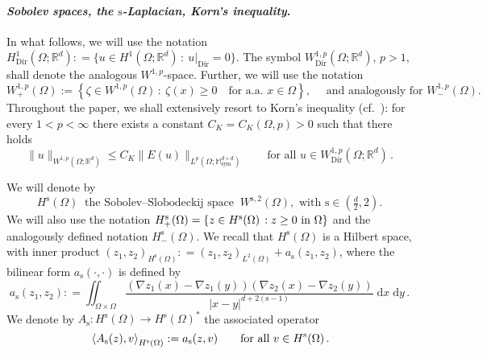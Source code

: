 \documentclass[a4paper,10pt,reqno]{amsart}
\numberwithin{equation}{section}
\newcommand{\bbM}{\mathbb{M}}
\newcommand{\R}{\mathbb{R}}
\numberwithin{equation}{section}
\def\dd{\;\!\mathrm{d}} %
\newcommand{\pairing}[4]{ \sideset{_{ #1 }}{_{ #2 }}  {\mathop{\langle #3 , #4
\rangle}}}
\newcommand{\foraa}{\text{for a.a. }}
\newcommand{\sig}[1]{E(#1)}
\newcommand{\Dir}{\mathrm{Dir}}
\newcommand{\mt}{\bbM}
\newcommand{\sym}{\mathrm{sym}}
\newcommand{\spz}{H^{\mathrm{s}}(\Omega)}
\newcommand{\As}{A_{\mathrm{s}}}
\newcommand{\ass}{a_{\mathrm{s}}}
\newcommand{\EEE}{\color{black}}
\newcommand{\MMM}{\color{black}}%
\begin{document}
    \paragraph{{\em Sobolev spaces, the $\mathrm{s}$-Laplacian, Korn's inequality}.}
  In what follows,  we will use the notation 
  $
  H_\Dir^1(\Omega;\R^d): = \{ u \in H^1(\Omega;\R^d)\, : \ u{|}_{\Dir} = 0 \}.
  $
  The symbol $W_\Dir^{1,p}(\Omega;\R^d)$, $p>1,$  shall denote the analogous $W^{1,p}$-space.
    Further,  we will use the notation \begin{equation}
\label{label-added}
 W_+^{1,p}(\Omega):= \left\{\zeta \in
W^{1,p}(\Omega)\, : \ \zeta(x) \geq 0  \quad \foraa x \in
\Omega \right\}, \quad \text{ and analogously for }
W_-^{1,p}(\Omega).
\end{equation} 
Throughout the paper,
 we shall extensively resort to Korn's inequality (cf.\ \cite{GeySu86}): for every $1<p<\infty$ there exists a constant $C_K = C_K(\Omega, p)>0$ such that there holds
\begin{equation}
\label{Korn}
\| u \|_{W^{1,p}(\Omega;\R^d)} \leq C_K \| \sig u \|_{L^p (\Omega;\mt_\sym^{d \times d})} 
\qquad \text{for all } u \in  W_\Dir^{1,p}(\Omega;\R^d)\,.
\end{equation}
\par
  We will denote by 
\[
  \spz  \   \text{ the  Sobolev--Slobodeckij space }  \  W^{\mathrm{s},2}(\Omega), \text{ with } \mathrm{s} \in \left( \tfrac d2, 2\right).
 \]
      We will also use the notation
      $  H_+^{\mathrm{s}}(\Omega) = \{ z \in \spz\, : z \geq 0 \ \MMM \text{in } \EEE  \Omega\}$ and the analogously defined notation
       $  H_-^{\mathrm{s}}(\Omega) $. 
We recall that $\spz$ is a Hilbert space, with  inner product $(z_1,z_2)_{\spz}: = (z_1,z_2)_{L^2(\Omega)} + \ass(z_1,z_2)$, where    the bilinear form $\ass(\cdot,\cdot)$ is defined by 
   \begin{equation}
   \label{a-s-form}
   \ass(z_1,z_2): = \iint_{\Omega\times\Omega} \frac{\left( \nabla z_1(x){-} \nabla z_1(y)\right) \left( \nabla z_2(x){-} \nabla z_2(y)\right) }{|x{-}y|^{d+2(\mathrm{s}{-}1)}} \dd x \dd y\,.
   \end{equation}
   We denote by  $\As: \spz \to \spz^*$ the associated operator
   \begin{equation}
 \label{s-Laplacian}
 \pairing{}{\spz}{\As(z)}{v}: = \ass(z,v) \qquad \text{for all } v \in \spz\,.
 \end{equation}
\end{document}
